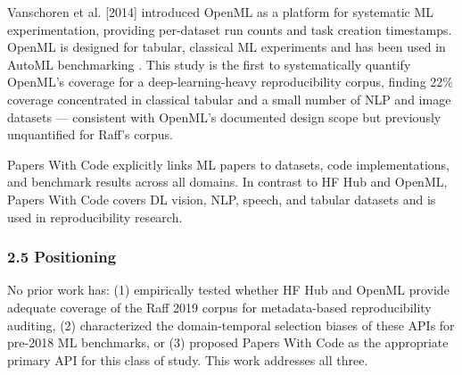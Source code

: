 Vanschoren et al. [2014] introduced OpenML as a platform for systematic ML experimentation, providing per-dataset run counts and task creation timestamps. OpenML is designed for tabular, classical ML experiments and has been used in AutoML benchmarking \citep{Feurer2022Auto}. This study is the first to systematically quantify OpenML's coverage for a deep-learning-heavy reproducibility corpus, finding 22\% coverage concentrated in classical tabular and a small number of NLP and image datasets --- consistent with OpenML's documented design scope but previously unquantified for Raff's corpus.

Papers With Code \citep{Stojnic2020Papers} explicitly links ML papers to datasets, code implementations, and benchmark results across all domains. In contrast to HF Hub and OpenML, Papers With Code covers DL vision, NLP, speech, and tabular datasets and is used in reproducibility research.

\subsubsection{2.5 Positioning}

No prior work has: (1) empirically tested whether HF Hub and OpenML provide adequate coverage of the Raff 2019 corpus for metadata-based reproducibility auditing, (2) characterized the domain-temporal selection biases of these APIs for pre-2018 ML benchmarks, or (3) proposed Papers With Code as the appropriate primary API for this class of study. This work addresses all three.

